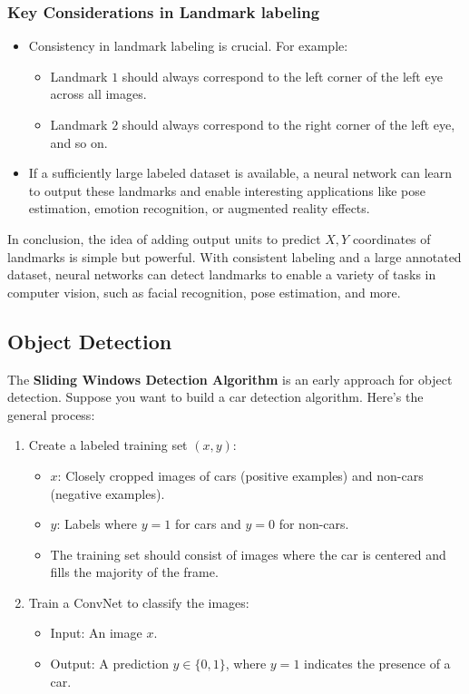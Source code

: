 \documentclass[letterpaper,12pt,notitlepage,twoside]{report}
\begin{document}
\subsubsection*{Key Considerations in Landmark labeling}
\begin{itemize}
    \item Consistency in landmark labeling is crucial. For example:
    \begin{itemize}
        \item Landmark \(1\) should always correspond to the left corner of the left eye across all images.
        \item Landmark \(2\) should always correspond to the right corner of the left eye, and so on.
    \end{itemize}
    \item If a sufficiently large labeled dataset is available, a neural network can learn to output these landmarks and enable interesting applications like pose estimation, emotion recognition, or augmented reality effects.
\end{itemize}

In conclusion, the idea of adding output units to predict \(X, Y\) coordinates of landmarks is simple but powerful. With consistent labeling and a large annotated dataset, neural networks can detect landmarks to enable a variety of tasks in computer vision, such as facial recognition, pose estimation, and more. 

\subsection{Object Detection}
The \textbf{Sliding Windows Detection Algorithm} is an early approach for object detection. Suppose you want to build a car detection algorithm. Here's the general process:
\begin{enumerate}
    \item Create a labeled training set \((x, y)\):
    \begin{itemize}
        \item \(x\): Closely cropped images of cars (positive examples) and non-cars (negative examples).
        \item \(y\): Labels where \(y = 1\) for cars and \(y = 0\) for non-cars.
        \item The training set should consist of images where the car is centered and fills the majority of the frame.
    \end{itemize}
    \item Train a ConvNet to classify the images:
    \begin{itemize}
        \item Input: An image \(x\).
        \item Output: A prediction \(y \in \{0, 1\}\), where \(y = 1\) indicates the presence of a car.
    \end{itemize}
\end{enumerate}
\end{document}
